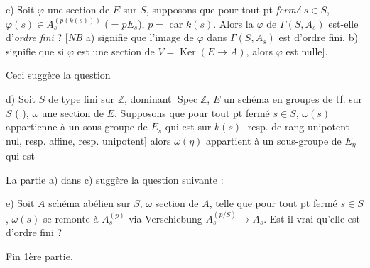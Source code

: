 \documentclass[11pt,a4paper]{article}
\begin{document}
c) Soit $\varphi$ une section de $E$ sur $S$, supposons que pour tout pt
\emph{fermé} $s\in S$, $\varphi(s)\in A_s^{(p(k(s)))}$ ($= pE_s$),
\uncertain{\ill{}} $p = $ car $k(s)$. Alors \struck{\ill{}} la 
$\varphi$ de $\Gamma(S,A_s)$ est-elle d'\emph{ordre fini} ? [\emph{NB} a)
signifie que l'image de $\varphi$ dans $\Gamma(S,A_s)$ est d'ordre fini, b)
signifie que si  $\varphi$ est une section
de $V = \operatorname{Ker}(E\to A)$, alors $\varphi$ est nulle].

Ceci suggère la question

d) Soit $S$ de type fini sur $\mathbb{Z}$, \struck{\ill{}} 
dominant $\operatorname{Spec}\mathbb{Z}$, \struck{\ill{}} $E$ un schéma en
groupes \struck{\ill{}} de tf. sur $S$ ( 
\uncertain{\ill{}}), $\omega$ une section de $E$. Supposons que pour tout pt
fermé $s\in S$, $\omega(s)$ appartienne \struck{\ill{}} à un sous-groupe
 de $E_s$ qui est \uncertain{\ill{}}  sur $k(s)$
[resp.  de rang unipotent nul, resp.  affine, resp.
 unipotent] alors $\omega(\eta)$ appartient à un sous-groupe de
$E_\eta$ qui est \uncertain{\ill{}}

La partie a) dans c) suggère la question suivante :

e) Soit $A$ schéma abélien sur $S$, $\omega$ section de $A$, telle que pour
tout pt fermé $s\in S$, $\omega(s)$ se remonte à $A_s^{(p)}$ via
Verschiebung $A_s^{(p/S)}\to A_s$. Est-il vrai qu'elle est d'ordre fini ?


Fin 1ère partie.
\end{document}
